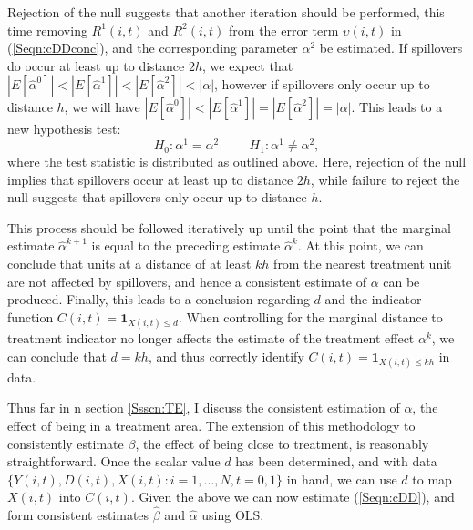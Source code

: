 \documentclass[12pt]{article}
\begin{document}
\begin{spacing}{1.3}
Rejection of the null suggests that another iteration should be performed, this 
time removing $R^1(i,t)$ and $R^2(i,t)$ from the error term $\upsilon(i,t)$ in 
(\ref{Seqn:cDDconc}), and the corresponding parameter $\alpha^2$ be estimated.  
If spillovers do occur at least up to distance $2h$, we expect that 
$|E[\hat\alpha^0]|<|E[\hat\alpha^1]|<|E[\hat\alpha^2]|<|\alpha|$, however if 
spillovers only occur up to distance $h$, we will have 
$|E[\hat\alpha^0]|<|E[\hat\alpha^1]|=|E[\hat\alpha^2]|=|\alpha|$.  This leads 
to a new hypothesis test:
\[
H_0: \alpha^1=\alpha^2 \hspace{1cm}
H_1: \alpha^1\neq\alpha^2,
\]
where the test statistic is distributed as outlined above.  Here, rejection of 
the null implies that spillovers occur at least up to distance $2h$, while 
failure to reject the null suggests that spillovers only occur up to distance 
$h$.

This process should be followed iteratively up until the point that the marginal 
estimate $\hat\alpha^{k+1}$ is equal to the preceding estimate $\hat\alpha^{k}$.  
At this point, we can conclude that units at a distance of at least $kh$ from 
the nearest treatment unit are not affected by spillovers, and hence a 
consistent estimate of $\alpha$ can be produced. Finally, this leads to a 
conclusion regarding $d$ and the indicator function $C(i,t)=\mathbf{1}_{X(i,t)
\leq d}$.  When controlling for the marginal distance to treatment indicator no 
longer affects the estimate of the treatment effect $\alpha^k$, we can conclude 
that $d=kh$, and thus correctly identify $C(i,t)=\mathbf{1}_{X(i,t)\leq kh}$ in 
data.

Thus far in
n section \ref{Ssscn:TE}, I discuss the consistent estimation of $\alpha$, the
effect of being in a treatment area.  The extension of this methodology to 
consistently estimate $\beta$, the effect of being close to treatment, is 
reasonably straightforward.  Once the scalar value $d$ has been determined, and
with data $\{Y(i,t), D(i,t), X(i,t): i=1, \ldots, N, t=0, 1\}$ in hand, we can 
use $d$ to map $X(i,t)$ into $C(i,t)$. Given the above we can now estimate 
(\ref{Seqn:cDD}), and form consistent estimates $\hat\beta$ and $\hat\alpha$ 
using OLS.


\end{spacing}
\end{document}
